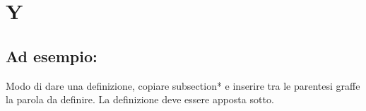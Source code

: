 \section*{Y}
\markright{}

\subsection*{Ad esempio:}
Modo di dare una definizione, copiare subsection*{} e inserire tra le parentesi graffe la parola da definire. La definizione deve essere apposta sotto.